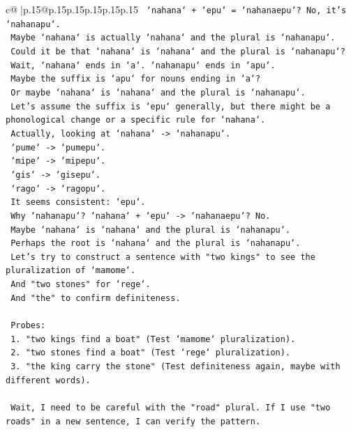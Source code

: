 \documentclass{article}
\begin{document}
{\begin{supertabular}{c@{$\;$}|p{.15\linewidth}@{}p{.15\linewidth}p{.15\linewidth}p{.15\linewidth}p{.15\linewidth}p{.15\linewidth}}
{{{\texttt{    `nahana` + `epu` = `nahanaepu`? No, it's `nahanapu`.} \\
\texttt{    Maybe `nahana` is actually `nahana` and the plural is `nahanapu`.} \\
\texttt{    Could it be that `nahana` is `nahana` and the plural is `nahanapu`?} \\
\texttt{    Wait, `nahana` ends in `a`. `nahanapu` ends in `apu`.} \\
\texttt{    Maybe the suffix is `apu` for nouns ending in `a`?} \\
\texttt{    Or maybe `nahana` is `nahana` and the plural is `nahanapu`.} \\
\texttt{    Let's assume the suffix is `epu` generally, but there might be a phonological change or a specific rule for `nahana`.} \\
\texttt{    Actually, looking at `nahana` {-}> `nahanapu`.} \\
\texttt{    `pume` {-}> `pumepu`.} \\
\texttt{    `mipe` {-}> `mipepu`.} \\
\texttt{    `gis` {-}> `gisepu`.} \\
\texttt{    `rago` {-}> `ragopu`.} \\
\texttt{    It seems consistent: `epu`.} \\
\texttt{    Why `nahanapu`? `nahana` + `epu` {-}> `nahanaepu`? No.} \\
\texttt{    Maybe `nahana` is `nahana` and the plural is `nahanapu`.} \\
\texttt{    Perhaps the root is `nahana` and the plural is `nahanapu`.} \\
\texttt{    Let's try to construct a sentence with "two kings" to see the pluralization of `mamome`.} \\
\texttt{    And "two stones" for `rege`.} \\
\texttt{    And "the" to confirm definiteness.} \\
\\ 
\texttt{    Probes:} \\
\texttt{    1.  "two kings find a boat" (Test `mamome` pluralization).} \\
\texttt{    2.  "two stones find a boat" (Test `rege` pluralization).} \\
\texttt{    3.  "the king carry the stone" (Test definiteness again, maybe with different words).} \\
\\ 
\texttt{    Wait, I need to be careful with the "road" plural. If I use "two roads" in a new sentence, I can verify the pattern.} \\
}}}
\end{supertabular}}
\end{document}
